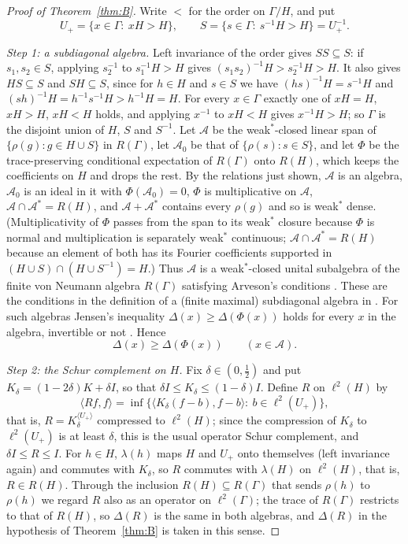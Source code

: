 \documentclass[11pt]{amsart}
\theoremstyle{remark}
\theoremstyle{definition}
\newcommand{\Ga}{\Gamma}
\newcommand{\FK}{\Delta}
\newcommand{\ltwo}{\ell^2}
\begin{document}
\begin{proof}[Proof of Theorem~\ref{thm:B}]
Write $<$ for the order on $\Ga/H$, and put
\[
U_+=\{x\in\Ga:\ xH>H\},\qquad S=\{s\in\Ga:\ s^{-1}H>H\}=U_+^{-1}.
\]

\emph{Step 1: a subdiagonal algebra.} Left invariance of the order gives $SS\subseteq S$: if $s_1,s_2\in S$, applying
$s_2^{-1}$ to $s_1^{-1}H>H$ gives $(s_1s_2)^{-1}H>s_2^{-1}H>H$. It also gives $HS\subseteq S$ and $SH\subseteq S$, since
for $h\in H$ and $s\in S$ we have $(hs)^{-1}H=s^{-1}H$ and $(sh)^{-1}H=h^{-1}s^{-1}H>h^{-1}H=H$. For every $x\in\Ga$ exactly one of $xH=H$, $xH>H$,
$xH<H$ holds, and applying $x^{-1}$ to $xH<H$ gives $x^{-1}H>H$; so $\Ga$ is the disjoint union of $H$, $S$ and
$S^{-1}$. Let $\mathcal A$ be the weak$^*$-closed linear span of $\{\rho(g):g\in H\cup S\}$ in $R(\Ga)$, let
$\mathcal A_0$ be that of $\{\rho(s):s\in S\}$, and let $\Phi$ be the trace-preserving conditional expectation of
$R(\Ga)$ onto $R(H)$, which keeps the coefficients on $H$ and drops the rest. By the relations just shown, $\mathcal A$
is an algebra, $\mathcal A_0$ is an ideal in it with $\Phi(\mathcal A_0)=0$, $\Phi$ is multiplicative on $\mathcal A$,
$\mathcal A\cap\mathcal A^*=R(H)$, and $\mathcal A+\mathcal A^*$ contains every $\rho(g)$ and so is weak$^*$ dense.
(Multiplicativity of $\Phi$ passes from the span to its weak$^*$ closure because $\Phi$ is normal and multiplication is
separately weak$^*$ continuous; $\mathcal A\cap\mathcal A^*=R(H)$ because an element of both has its Fourier coefficients
supported in $(H\cup S)\cap(H\cup S^{-1})=H$.) Thus $\mathcal A$ is a weak$^*$-closed unital subalgebra of the finite
von Neumann algebra $R(\Ga)$ satisfying Arveson's conditions \cite{Arv67}. These are the conditions in the definition
of a (finite maximal) subdiagonal algebra in \cite[Sec.~1]{BL}. For such algebras Jensen's inequality $\FK(x)\ge\FK(\Phi(x))$ holds for every $x$ in the algebra,
invertible or not \cite[Cor.~3.3]{BL}. Hence
\begin{equation}\label{eq:jensen}
\FK(x)\ge\FK(\Phi(x))\qquad(x\in\mathcal A).
\end{equation}

\emph{Step 2: the Schur complement on $H$.} Fix $\delta\in(0,\tfrac12)$ and put $K_\delta=(1-2\delta)K+\delta I$, so
that $\delta I\le K_\delta\le(1-\delta)I$. Define $R$ on $\ltwo(H)$ by
\[
\langle Rf,f\rangle=\inf\bigl\{\langle K_\delta(f-b),f-b\rangle:\ b\in\ltwo(U_+)\bigr\},
\]
that is, $R=K_\delta^{\langle U_+\rangle}$ compressed to $\ltwo(H)$; since the compression of $K_\delta$ to
$\ltwo(U_+)$ is at least $\delta$, this is the usual operator Schur complement, and $\delta I\le R\le I$. For $h\in H$,
$\lambda(h)$ maps $H$ and $U_+$ onto themselves (left invariance again) and commutes with $K_\delta$, so $R$ commutes
with $\lambda(H)$ on $\ltwo(H)$, that is, $R\in R(H)$. Through the inclusion $R(H)\subseteq R(\Ga)$ that sends
$\rho(h)$ to $\rho(h)$ we regard $R$ also as an operator on $\ltwo(\Ga)$; the trace of $R(\Ga)$ restricts to that of
$R(H)$, so $\FK(R)$ is the same in both algebras, and $\FK(R)$ in the hypothesis of Theorem~\ref{thm:B} is taken in
this sense.


\end{proof}
\end{document}
